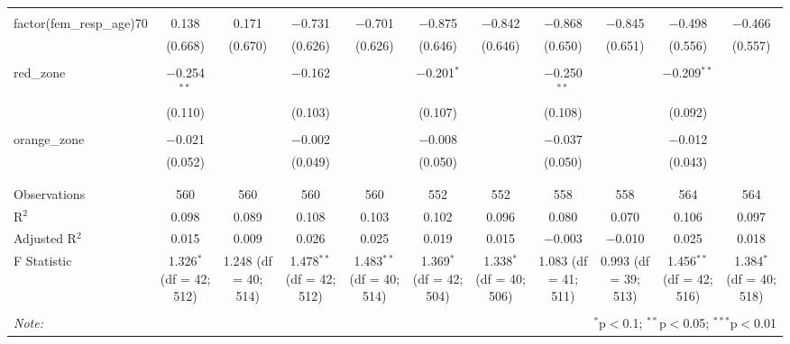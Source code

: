 \begin{table}[!htbp]
\begin{tabular}{@{\extracolsep{5pt}}lcccccccccc}
  & & & & & & & & & & \\ 
 factor(fem\_resp\_age)70 & 0.138 & 0.171 & $-$0.731 & $-$0.701 & $-$0.875 & $-$0.842 & $-$0.868 & $-$0.845 & $-$0.498 & $-$0.466 \\ 
  & (0.668) & (0.670) & (0.626) & (0.626) & (0.646) & (0.646) & (0.650) & (0.651) & (0.556) & (0.557) \\ 
  & & & & & & & & & & \\ 
 red\_zone & $-$0.254$^{**}$ &  & $-$0.162 &  & $-$0.201$^{*}$ &  & $-$0.250$^{**}$ &  & $-$0.209$^{**}$ &  \\ 
  & (0.110) &  & (0.103) &  & (0.107) &  & (0.108) &  & (0.092) &  \\ 
  & & & & & & & & & & \\ 
 orange\_zone & $-$0.021 &  & $-$0.002 &  & $-$0.008 &  & $-$0.037 &  & $-$0.012 &  \\ 
  & (0.052) &  & (0.049) &  & (0.050) &  & (0.050) &  & (0.043) &  \\ 
  & & & & & & & & & & \\ 
\hline \\[-1.8ex] 
Observations & 560 & 560 & 560 & 560 & 552 & 552 & 558 & 558 & 564 & 564 \\ 
R$^{2}$ & 0.098 & 0.089 & 0.108 & 0.103 & 0.102 & 0.096 & 0.080 & 0.070 & 0.106 & 0.097 \\ 
Adjusted R$^{2}$ & 0.015 & 0.009 & 0.026 & 0.025 & 0.019 & 0.015 & $-$0.003 & $-$0.010 & 0.025 & 0.018 \\ 
F Statistic & 1.326$^{*}$ (df = 42; 512) & 1.248 (df = 40; 514) & 1.478$^{**}$ (df = 42; 512) & 1.483$^{**}$ (df = 40; 514) & 1.369$^{*}$ (df = 42; 504) & 1.338$^{*}$ (df = 40; 506) & 1.083 (df = 41; 511) & 0.993 (df = 39; 513) & 1.456$^{**}$ (df = 42; 516) & 1.384$^{*}$ (df = 40; 518) \\ 
\hline 
\hline \\[-1.8ex] 
\textit{Note:}  & \multicolumn{10}{r}{$^{*}$p$<$0.1; $^{**}$p$<$0.05; $^{***}$p$<$0.01} \\ 
\end{tabular} 
\end{table} 
